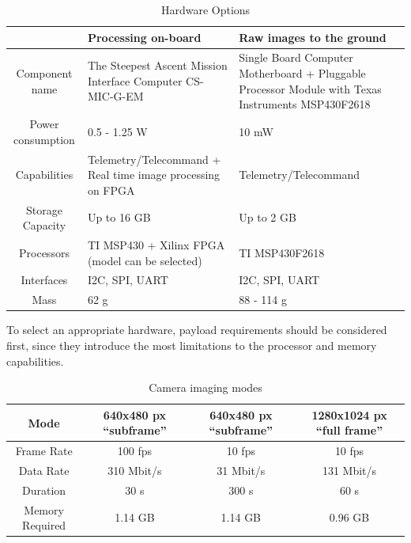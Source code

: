 \documentclass[12pt]{article}
\begin{document}
\begin{table}[ht]
\caption{Hardware Options}
\label{table:avionics_hardware_options}
\begin{center}
    \begin{tabular}{| c || p{6cm} | p{6cm} |} \hline
     &	\textbf{Processing on-board} & \textbf{Raw images to the ground} \\ \hline \hline
    Component name & The Steepest Ascent Mission Interface Computer CS-MIC-G-EM & Single Board Computer Motherboard + Pluggable Processor Module with Texas Instruments MSP430F2618 \\ \hline
    Power consumption & 0.5 - 1.25 W & 10 mW \\ \hline
    Capabilities & Telemetry/Telecommand + Real time image processing on FPGA & Telemetry/Telecommand\\ \hline
    Storage Capacity & Up to 16 GB & Up to 2 GB \\ \hline
    Processors & TI MSP430  + Xilinx FPGA (model can be selected) & TI MSP430F2618 \\ \hline
    Interfaces & I2C, SPI, UART & I2C, SPI, UART \\ \hline
    Mass & 62 g & 88 - 114 g \\ \hline 
    \end{tabular}
\end{center}
\end{table}

To select an appropriate hardware, payload requirements should be considered first, since they introduce the most limitations to the processor and memory capabilities.

\begin{table}[ht]
\caption{Camera imaging modes}
\label{table:avionics_modes}
\begin{center}
    \begin{tabular}{| c || c | c | c |} \hline
    	\textbf{Mode} & \textbf{640x480 px ``subframe''} &  \textbf{640x480 px ``subframe''} & \textbf{1280x1024 px  ``full frame''} \\ \hline \hline
    Frame Rate & 100 fps & 10 fps & 10 fps \\ \hline
    Data Rate & 310 Mbit/s & 31 Mbit/s & 131 Mbit/s \\ \hline
    Duration & 30 s & 300 s & 60 s \\ \hline
    Memory Required & 1.14 GB & 1.14 GB & 0.96 GB \\ \hline 
    \end{tabular}
\end{center}
\end{table}
\end{document}
